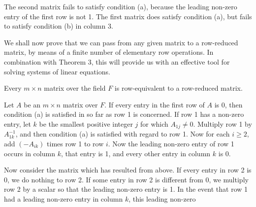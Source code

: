 The second matrix fails to satisfy condition (a), because the leading non-zero entry of the first row is not 1. The first matrix does satisfy condition (a), but fails to satisfy condition (b) in column 3.

We shall now prove that we can pass from any given matrix to a row-reduced matrix, by means of a finite number of elementary row operations. In combination with Theorem 3, this will provide us with an effective tool for solving systems of linear equations.

Every \(m\times n\) matrix over the field \(F\) is row-equivalent to a row-reduced matrix.

Let \(A\) be an \(m\times n\) matrix over \(F\). If every entry in the first row of \(A\) is 0, then condition (a) is satisfied in so far as row 1 is concerned. If row 1 has a non-zero entry, let \(k\) be the smallest positive integer \(j\) for which \(A_{1j}\neq 0\). Multiply row 1 by \(A_{1k}^{-1}\), and then condition (a) is satisfied with regard to row 1. Now for each \(i\geq 2\), add \((-A_{ik})\) times row 1 to row \(i\). Now the leading non-zero entry of row 1 occurs in column \(k\), that entry is 1, and every other entry in column \(k\) is 0.

Now consider the matrix which has resulted from above. If every entry in row 2 is 0, we do nothing to row 2. If some entry in row 2 is different from 0, we multiply row 2 by a scalar so that the leading non-zero entry is 1. In the event that row 1 had a leading non-zero entry in column \(k\), this leading non-zero 